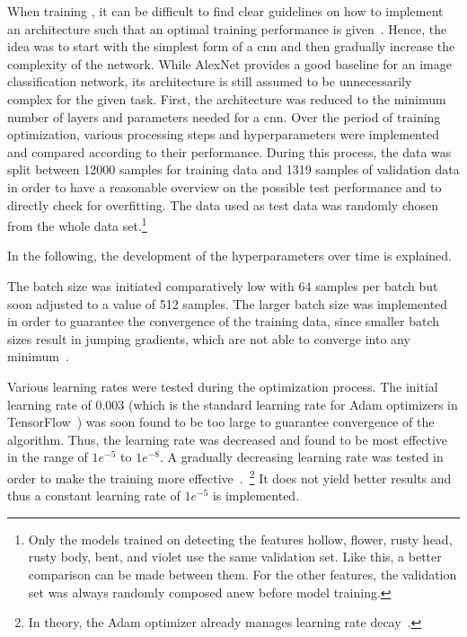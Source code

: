 When training , it can be difficult to find clear guidelines on how to implement an architecture such that an optimal training performance is given~\citep{heaton2015aifh,geron2019hands,bettilyon2018classify}. Hence, the idea was to start with the simplest form of a \acrshort{cnn} and then gradually increase the complexity of the network. While AlexNet provides a good baseline for an image classification network, its architecture is still assumed to be unnecessarily complex for the given task. First, the architecture was reduced to the minimum number of layers and parameters needed for a \acrshort{cnn}. Over the period of training optimization, various processing steps and hyperparameters were implemented and compared according to their performance. During this process, the data was split between 12000 samples for training data and 1319 samples of validation data in order to have a reasonable overview on the possible test performance and to directly check for overfitting. The data used as test data was randomly chosen from the whole data set.\footnote{Only the models trained on detecting the features hollow, flower, rusty head, rusty body, bent, and violet use the same validation set. Like this, a better comparison can be made between them. For the other features, the validation set was always randomly composed anew before model training.}

\bigskip
In the following, the development of the hyperparameters over time is explained.
 
The batch size was initiated comparatively low with 64 samples per batch but soon adjusted to a value of 512 samples. The larger batch size was implemented in order to guarantee the convergence of the training data, since smaller batch sizes result in jumping gradients, which are not able to converge into any minimum~\citep{bengio2012practical}.
 
Various learning rates were tested during the optimization process. The initial learning rate of 0.003 (which is the standard learning rate for Adam optimizers in TensorFlow~\citep{kingma2014adam,geron2019hands}) was soon found to be too large to guarantee convergence of the algorithm. Thus, the learning rate was decreased and found to be most effective in the range of \(1e^{-5}\) to \(1e^{-8}\). A gradually decreasing learning rate was tested in order to make the training more effective~\citep{bengio2012practical}.~\footnote{In theory, the Adam optimizer already manages learning rate decay~\citep{kingma2014adam}.} It does not yield better results and thus a constant learning rate of \(1e^{-5}\) is implemented.
 
